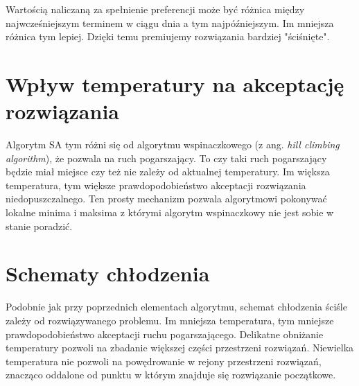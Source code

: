 Wartością naliczaną za spełnienie preferencji może być różnica między
najwcześniejszym terminem w ciągu dnia a tym najpóźniejszym. Im mniejsza różnica
tym lepiej. Dzięki temu premiujemy rozwiązania bardziej "ściśnięte".

\section{Wpływ temperatury na akceptację rozwiązania}
Algorytm SA tym różni się od algorytmu wspinaczkowego (z ang. \emph{hill
climbing algorithm}), że pozwala na ruch pogarszający. To czy taki ruch
pogarszający będzie miał miejsce czy też nie zależy od aktualnej temperatury. Im
większa temperatura, tym większe prawdopodobieństwo akceptacji rozwiązania
niedopuszczalnego. Ten prosty mechanizm pozwala algorytmowi pokonywać lokalne
minima i maksima z którymi algorytm wspinaczkowy nie jest sobie w stanie
poradzić.

\section{Schematy chłodzenia}
Podobnie jak przy poprzednich elementach algorytmu, schemat chłodzenia ściśle
zależy od rozwiązywanego problemu. Im mniejsza temperatura, tym mniejsze
prawdopodobieństwo akceptacji ruchu pogarszającego. Delikatne obniżanie
temperatury pozwoli na zbadanie większej części przestrzeni rozwiązań. Niewielka
temperatura nie pozwoli na powędrowanie w rejony przestrzeni rozwiązań, znacząco
oddalone od punktu w którym znajduje się rozwiązanie początkowe.

